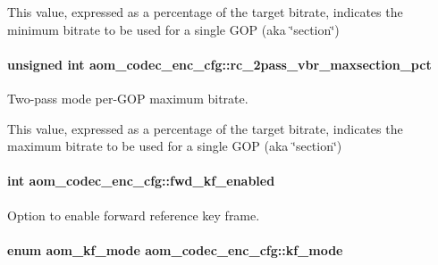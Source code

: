 This value, expressed as a percentage of the target bitrate, indicates the minimum bitrate to be used for a single G\+OP (aka \char`\"{}section\char`\"{}) 
\paragraph[{\texorpdfstring{rc\+\_\+2pass\+\_\+vbr\+\_\+maxsection\+\_\+pct}{rc_2pass_vbr_maxsection_pct}}]{\setlength{\rightskip}{0pt plus 5cm}unsigned int aom\+\_\+codec\+\_\+enc\+\_\+cfg\+::rc\+\_\+2pass\+\_\+vbr\+\_\+maxsection\+\_\+pct}\hypertarget{structaom__codec__enc__cfg_a5610caa642c808af885c1521e916a1e6}{}\label{structaom__codec__enc__cfg_a5610caa642c808af885c1521e916a1e6}


Two-\/pass mode per-\/\+G\+OP maximum bitrate. 

This value, expressed as a percentage of the target bitrate, indicates the maximum bitrate to be used for a single G\+OP (aka \char`\"{}section\char`\"{}) 
\paragraph[{\texorpdfstring{fwd\+\_\+kf\+\_\+enabled}{fwd_kf_enabled}}]{\setlength{\rightskip}{0pt plus 5cm}int aom\+\_\+codec\+\_\+enc\+\_\+cfg\+::fwd\+\_\+kf\+\_\+enabled}\hypertarget{structaom__codec__enc__cfg_aae6716f2cd78979c59f7fa39fec1717f}{}\label{structaom__codec__enc__cfg_aae6716f2cd78979c59f7fa39fec1717f}


Option to enable forward reference key frame. 

\paragraph[{\texorpdfstring{kf\+\_\+mode}{kf_mode}}]{\setlength{\rightskip}{0pt plus 5cm}enum {\bf aom\+\_\+kf\+\_\+mode} aom\+\_\+codec\+\_\+enc\+\_\+cfg\+::kf\+\_\+mode}\hypertarget{structaom__codec__enc__cfg_a3c1ea7f3ea90b9b8eab4c3f266ffacdc}{}\label{structaom__codec__enc__cfg_a3c1ea7f3ea90b9b8eab4c3f266ffacdc}


